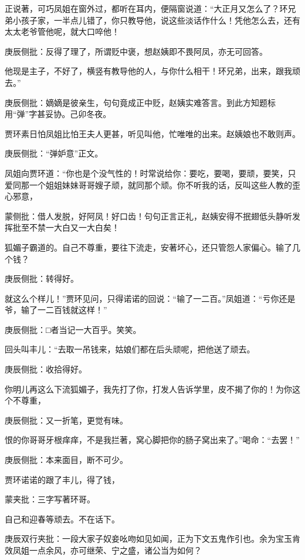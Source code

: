 \begin{parag}


    正说著，可巧凤姐在窗外过，都听在耳内，便隔窗说道：“大正月又怎么了？环兄弟小孩子家，一半点儿错了，你只教导他，说这些淡话作什么！凭他怎么去，还有太太老爷管他呢，就大口啐他！\begin{note}庚辰侧批：反得了理了，所谓贬中褒，想赵姨即不畏阿凤，亦无可回答。\end{note}他现是主子，不好了，横竖有教导他的人，与你什么相干！环兄弟，出来，跟我顽去。”\begin{note}庚辰侧批：嫡嫡是彼亲生，句句竟成正中贬，赵姨实难答言。到此方知题标用“弹”字甚妥协。己卯冬夜。\end{note}贾环素日怕凤姐比怕王夫人更甚，听见叫他，忙唯唯的出来。赵姨娘也不敢则声。\begin{note}庚辰侧批：“弹妒意”正文。\end{note}凤姐向贾环道：“你也是个没气性的！时常说给你：要吃，要喝，要顽，要笑，只爱同那一个姐姐妹妹哥哥嫂子顽，就同那个顽。你不听我的话，反叫这些人教的歪心邪意，\begin{note}蒙侧批：借人发脱，好阿凤！好口齿！句句正言正礼，赵姨安得不抿翅低头静听发挥批至不禁一大白又一大白矣！\end{note}狐媚子霸道的。自己不尊重，要往下流走，安著坏心，还只管怨人家偏心。输了几个钱？\begin{note}庚辰侧批：转得好。\end{note}就这么个样儿！”贾环见问，只得诺诺的回说：“输了一二百。”凤姐道：“亏你还是爷，输了一二百钱就这样！”\begin{note}庚辰侧批：□者当记一大百乎。笑笑。\end{note}回头叫丰儿：“去取一吊钱来，姑娘们都在后头顽呢，把他送了顽去。\begin{note}庚辰侧批：收拾得好。\end{note}你明儿再这么下流狐媚子，我先打了你，打发人告诉学里，皮不揭了你的！为你这个不尊重，\begin{note}庚辰侧批：又一折笔，更觉有味。\end{note}恨的你哥哥牙根痒痒，不是我拦著，窝心脚把你的肠子窝出来了。”喝命：“去罢！”\begin{note}庚辰侧批：本来面目，断不可少。\end{note}贾环诺诺的跟了丰儿，得了钱，\begin{note}蒙夹批：三字写著环哥。\end{note}自己和迎春等顽去。不在话下。\begin{note}庚辰双行夹批：一段大家子奴妾吆吻如见如闻，正为下文五鬼作引也。余为宝玉肯效凤姐一点余风，亦可继荣、宁之盛，诸公当为如何？\end{note}
\end{parag}



